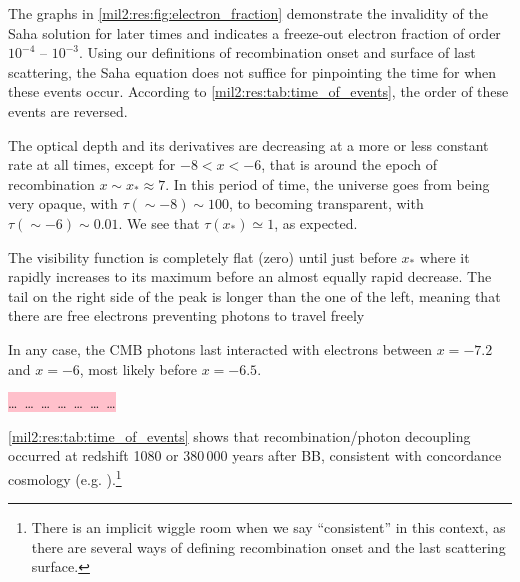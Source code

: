 




The graphs in \cref{mil2:res:fig:electron_fraction} demonstrate the invalidity of the Saha solution for later times and indicates a freeze-out electron fraction of order $10^{-4}$ -- $10^{-3}$. Using our definitions of recombination onset and surface of last scattering, the Saha equation does not suffice for pinpointing the time for when these events occur. According to \cref{mil2:res:tab:time_of_events}, the order of these events are reversed. 

The optical depth and its derivatives are decreasing at a more or less constant rate at all times, except for $-8 < x < -6$, that is around the epoch of recombination $x\sim x_*\approx 7$. In this period of time, the universe goes from being very opaque, with $\tau(\sim-8)\sim 100$, to becoming transparent, with $\tau(\sim -6)\sim 0.01$. We see that $\tau(x_*)\simeq 1$, as expected. 

The visibility function is completely flat (zero) until just before $x_*$ where it rapidly increases to its maximum before an almost equally rapid decrease. The tail on the right side of the peak is longer than the one of the left, meaning that there are free electrons preventing photons to travel freely

In any case, the CMB photons last interacted with electrons between $x=-7.2$ and $x=-6$, most likely before $x=-6.5$.

\colorbox{pink}{\dots \, \dots \, \dots \, \dots \, \dots \, \dots \, \dots }


\cref{mil2:res:tab:time_of_events} shows that recombination/photon decoupling occurred at redshift 1080 or 380\,000 years after BB, consistent with concordance cosmology (e.g. \citep[Tab. 3.1]{Baumann}).\footnote{There is an implicit wiggle room when we say ``consistent'' in this context, as there are several ways of defining recombination onset and the last scattering surface.} 